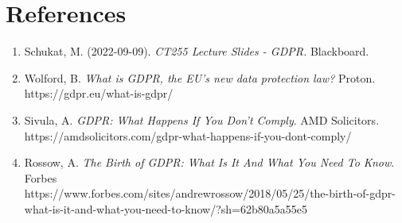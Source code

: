 \documentclass[a4paper]{article}
\begin{document}
\bigskip

\section{References}
\begin{enumerate}
    \item Schukat, M. (2022-09-09). \textit{CT255 Lecture Slides - GDPR.} Blackboard. 
    \item Wolford, B. \textit{What is GDPR, the EU's new data protection law?} Proton. https://gdpr.eu/what-is-gdpr/
    \item Sivula, A. \textit{GDPR: What Happens If You Don't Comply}. AMD Solicitors. https://amdsolicitors.com/gdpr-what-happens-if-you-dont-comply/
    \item Rossow, A. \textit{The Birth of GDPR: What Is It And What You Need To Know}. Forbes\\ https://www.forbes.com/sites/andrewrossow/2018/05/25/the-birth-of-gdpr-what-is-it-and-what-you-need-to-know/?sh=62b80a5a55e5
\end{enumerate}
\end{document}
